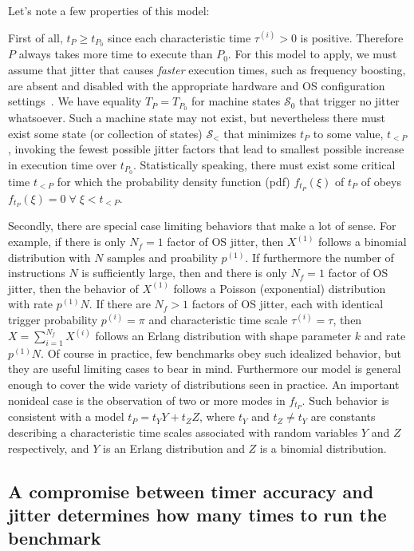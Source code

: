 \documentclass[conference]{IEEEtran}
\begin{document}
Let's note a few properties of this model:

First of all, $t_P \ge t_{P_0}$ since each characteristic time $\tau^{(i)} > 0$ is positive. Therefore $P$ always takes more time to execute than $P_0$.
For this model to apply, we must assume that jitter that causes \textit{faster}
execution times, such as frequency boosting, are absent and disabled with the
appropriate hardware and OS configuration settings~\cite{basebenchmarkschecklist}. We have equality $T_P = T_{P_0}$
for machine states $\mathcal S_0$ that trigger no jitter whatsoever. Such a machine state may not exist, but nevertheless there must exist some state (or collection of states) $\mathcal S_<$ that minimizes $t_P$ to some value, $t_{<P}$, invoking the fewest possible jitter factors that lead to smallest possible increase in execution time over $t_{P_0}$.
Statistically speaking, there must exist some critical time $t_{<P}$ for which the probability density function (pdf) $f_{t_P}(\xi)$ of $t_P$ of obeys $f_{t_P}(\xi) = 0 \; \forall \; \xi < t_{<P}$.

Secondly, there are special case limiting behaviors that make a lot of sense. For example, if there is only $N_f = 1$ factor of OS jitter, then $X^{(1)}$ follows a binomial distribution with $N$ samples and proability $p^{(1)}$. If furthermore the number of instructions $N$ is sufficiently large, then and there is only $N_f = 1$ factor of OS jitter, then the behavior of $X^{(1)}$ follows a Poisson (exponential) distribution with rate $p^{(1)} N$. If there are $N_f > 1$ factors of OS jitter, each with identical trigger probability $p^{(i)} = \pi$ and characteristic time scale $\tau^{(i)} = \tau$, then $X = \sum_{i=1}^{N_f} X^{(i)}$ follows an Erlang distribution with shape parameter $k$ and rate $p^{(1)} N$. Of course in practice, few benchmarks obey such idealized behavior, but they are useful limiting cases to bear in mind. Furthermore our model is general enough to cover the wide variety of distributions seen in practice. An important nonideal case is the observation of two or more modes in $f_{t_P}$. Such behavior is consistent with a model $t_P = t_Y Y + t_Z Z$, where $t_Y$ and $t_Z \ne t_Y$ are constants describing a characteristic time scales associated with random variables $Y$ and $Z$ respectively, and $Y$ is an Erlang distribution and $Z$ is a binomial distribution.



\subsection{A compromise between timer accuracy and jitter determines how many times to run the benchmark}
\end{document}
